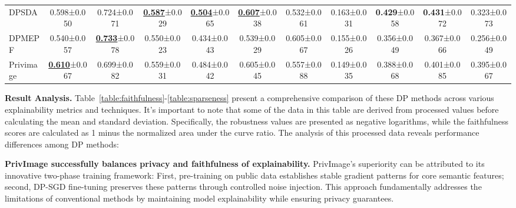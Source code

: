 \documentclass{article}
\begin{document}
\begin{table*}[htbp]
{{\begin{tabular}{l|*{5}{cc}}
\hline
DPSDA & 0.598±0.050 & 0.724±0.071 & \textbf{\underline{0.587}}±0.029 & \textbf{\underline{0.504}}±0.065 & \textbf{\underline{0.607}}±0.038 & 0.532±0.061 & 0.163±0.031 & \textbf{0.429}±0.058 & \textbf{0.431}±0.072 & 0.323±0.073 \\
DPMEPF & 0.540±0.057 & \textbf{\underline{0.733}}±0.078 & 0.550±0.023 & 0.434±0.043 & 0.539±0.029 & 0.605±0.067 & 0.155±0.026 & 0.356±0.049 & 0.367±0.066 & 0.256±0.049 \\
Privimage & \textbf{\underline{0.610}}±0.067 & 0.699±0.082 & 0.559±0.031 & 0.484±0.042 & 0.605±0.045 & 0.557±0.088 & 0.149±0.035 & 0.388±0.068 & 0.401±0.085 & 0.395±0.067 \\
\bottomrule
\end{tabular}%
}}
\end{table*}

\noindent \textbf{Result Analysis.}
Table~\ref{table:faithfulness}-\ref{table:sparseness} present a comprehensive comparison of these DP methods across various explainability metrics and techniques. It's important to note that some of the data in this table are derived from processed values before calculating the mean and standard deviation. Specifically, the robustness values are presented as negative logarithms, while the faithfulness scores are calculated as 1 minus the normalized area under the curve ratio. The analysis of this processed data reveals performance differences among DP methods:


\begin{tcolorbox}[colback=gray!20, colframe=gray!20, boxrule=0pt, arc=0pt, left=5pt, right=5pt, top=5pt, bottom=5pt]
\noindent \textbf{PrivImage successfully balances privacy and faithfulness of explainability.} PrivImage's superiority can be attributed to its innovative two-phase training framework: First, pre-training on public data establishes stable gradient patterns for core semantic features; second, DP-SGD fine-tuning preserves these patterns through controlled noise injection. This approach fundamentally addresses the limitations of conventional methods by maintaining model explainability while ensuring privacy guarantees.
\end{tcolorbox}
\end{document}
